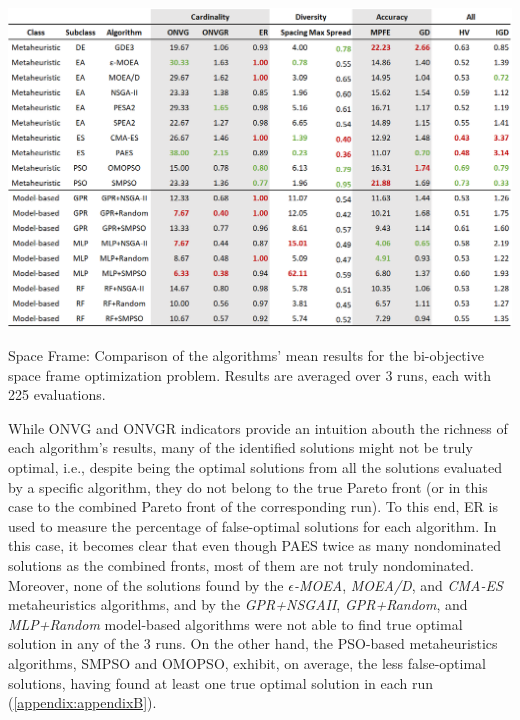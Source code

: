 \begin{table}[h!]
	\centering
	\includegraphics[width=\textwidth]{Images/Evaluation/caadria/Results_Mean_20190416.PNG}
	\caption[Space Frame: Mean performance values of the algorithms' results]{Space Frame: Comparison of the algorithms' mean results for the bi-objective space frame optimization problem. Results are averaged over 3 runs, each with 225 evaluations.}
	\label{table:spaceframe}
\end{table}

While \ac{ONVG} and \ac{ONVGR} indicators provide an intuition abouth the richness of each algorithm's results, many of the identified solutions might not be truly optimal, i.e., despite being the optimal solutions from all the solutions evaluated by a specific algorithm, they do not belong to the true Pareto front (or in this case to the combined Pareto front of the corresponding run). To this end, \ac{ER} is used to measure the percentage of false-optimal solutions for each algorithm. In this case, it becomes clear that even though PAES twice as many nondominated solutions as the combined fronts, most of them are not truly nondominated. Moreover, none of the solutions found by the \textit{$\epsilon$-MOEA}, \textit{MOEA/D}, and \textit{CMA-ES} metaheuristics algorithms, and by the \textit{GPR+NSGAII}, \textit{GPR+Random}, and \textit{MLP+Random} model-based algorithms were not able to find true optimal solution in any of the 3 runs. On the other hand, the \ac{PSO}-based metaheuristics algorithms, SMPSO and OMOPSO, exhibit, on average, the less false-optimal solutions, having found at least one true optimal solution in each run (\cref{appendix:appendixB}).

